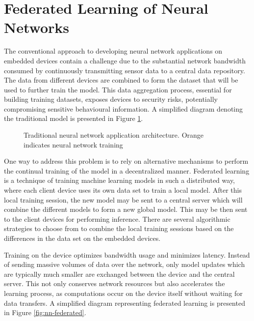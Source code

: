 \section{Federated Learning of Neural Networks}

The conventional approach to developing neural network applications on embedded devices contain a challenge due to the substantial network bandwidth consumed by continuously transmitting sensor data to a central data repository. The data from different devices are combined to form the dataset that will be used to further train the model. This data aggregation process, essential for building training datasets, exposes devices to security risks, potentially compromising sensitive behavioural information. A simplified diagram denoting the traditional model is presented in Figure \ref{fig:nn-traditional}.

\begin{figure}[h]
	\centering
	\caption{Traditional neural network application architecture. Orange indicates neural network training}
	\label{fig:nn-traditional}
\end{figure}

One way to address this problem is to rely on alternative mechanisms to perform the continual training of the model in a decentralized manner. Federated learning is a technique of training machine learning models in such a distributed way, where each client device uses its own data set to train a local model. After this local training session, the new model may be sent to a central server which will combine the different models to form a new global model. This may be then sent to the client devices for performing inference. There are several algorithmic strategies to choose from to combine the local training sessions based on the differences in the data set on the embedded devices.

Training on the device optimizes bandwidth usage and minimizes latency. Instead of sending massive volumes of data over the network, only model updates which are typically much smaller are exchanged between the device and the central server. This not only conserves network resources but also accelerates the learning process, as computations occur on the device itself without waiting for data transfers. A simplified diagram representing federated learning is presented in Figure \ref{fig:nn-federated}.

